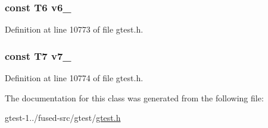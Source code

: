 \hypertarget{classtesting_1_1internal_1_1ValueArray7_a13d84d5824617bbc6fb1a6b3ee3cb745}{
\subsubsection[{v6\-\_\-}]{\setlength{\rightskip}{0pt plus 5cm}const \-T6 {\bf v6\-\_\-}}}\label{d7/d43/classtesting_1_1internal_1_1ValueArray7_a13d84d5824617bbc6fb1a6b3ee3cb745}


\-Definition at line 10773 of file gtest.\-h.

\hypertarget{classtesting_1_1internal_1_1ValueArray7_a4063f0b7a528133d018ee488ba44a9a3}{
\subsubsection[{v7\-\_\-}]{\setlength{\rightskip}{0pt plus 5cm}const \-T7 {\bf v7\-\_\-}}}\label{d7/d43/classtesting_1_1internal_1_1ValueArray7_a4063f0b7a528133d018ee488ba44a9a3}


\-Definition at line 10774 of file gtest.\-h.



\-The documentation for this class was generated from the following file\-:\begin{DoxyCompactItemize}
\item 
gtest-\/1../fused-\/src/gtest/\hyperlink{fused-src_2gtest_2gtest_8h}{gtest.\-h}\end{DoxyCompactItemize}

